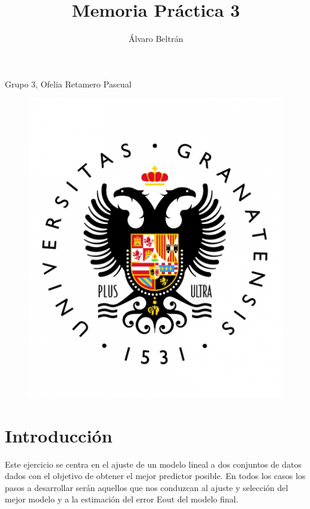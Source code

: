 \documentclass[a4paper,11pt]{article}
\title{Memoria Práctica 3}
\author{Álvaro Beltrán}
\begin{document}
\maketitle
\begin{center}
Grupo 3, Ofelia Retamero Pascual
\end{center}

\begin{figure}[h]
\includegraphics[scale=0.3]{UGR}
\centering
\end{figure}

\newpage

\renewcommand*\contentsname{Índice}
\tableofcontents

\newpage

\section{Introducción}
Este ejercicio se centra en el ajuste de un modelo lineal a dos conjuntos de datos dados con el
objetivo de obtener el mejor predictor posible. En todos los casos los pasos a desarrollar serán
aquellos que nos conduzcan al ajuste y selección del mejor modelo y a la estimación del error
Eout del modelo final.
\end{document}
